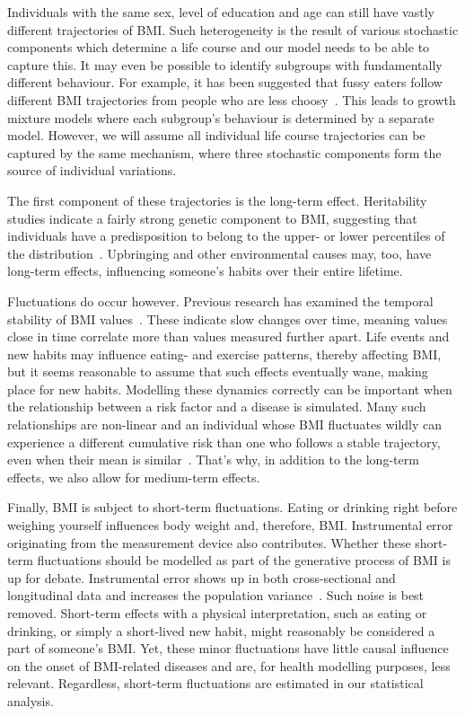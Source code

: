\documentclass{imammb}
\numberwithin{equation}{section}
\begin{document}
Individuals with the same sex, level of education and age can still have vastly different trajectories of BMI. Such heterogeneity is the result of various stochastic components which determine a life course and our model needs to be able to capture this. It may even be possible to identify subgroups with fundamentally different behaviour. For example, it has been suggested that fussy eaters follow different BMI trajectories from people who are less choosy~\citep{Herle2020}. This leads to growth mixture models where each subgroup's behaviour is determined by a separate model. However, we will assume all individual life course trajectories can be captured by the same mechanism, where three stochastic components form the source of individual variations.

The first component of these trajectories is the long-term effect. Heritability studies indicate a fairly strong genetic component to BMI, suggesting that individuals have a predisposition to belong to the upper- or lower percentiles of the distribution~\citep{Mathias2003, Goode2007, Ordonana2007}. Upbringing and other environmental causes may, too, have long-term effects, influencing someone's habits over their entire lifetime.

Fluctuations do occur however. Previous research has examined the temporal stability of BMI values~\citep{Wilsgaard2001, Ulmer2003, Juhola2011, Bayer2011}. These indicate slow changes over time, meaning values close in time correlate more than values measured further apart. Life events and new habits may influence eating- and exercise patterns, thereby affecting BMI, but it seems reasonable to assume that such effects eventually wane, making place for new habits. Modelling these dynamics correctly can be important when the relationship between a risk factor and a disease is simulated. Many such relationships are non-linear and an individual whose BMI fluctuates wildly can experience a different cumulative risk than one who follows a stable trajectory, even when their mean is similar~\citep{Murray2020}. That's why, in addition to the long-term effects, we also allow for medium-term effects.

Finally, BMI is subject to short-term fluctuations. Eating or drinking right before weighing yourself influences body weight and, therefore, BMI. Instrumental error originating from the measurement device also contributes. Whether these short-term fluctuations should be modelled as part of the generative process of BMI is up for debate. Instrumental error shows up in both cross-sectional and longitudinal data and increases the population variance~\citep{Biehl2013}. Such noise is best removed. Short-term effects with a physical interpretation, such as eating or drinking, or simply a short-lived new habit, might reasonably be considered a part of someone's BMI. Yet, these minor fluctuations have little causal influence on the onset of BMI-related diseases and are, for health modelling purposes, less relevant. Regardless, short-term fluctuations are estimated in our statistical analysis.
\end{document}
